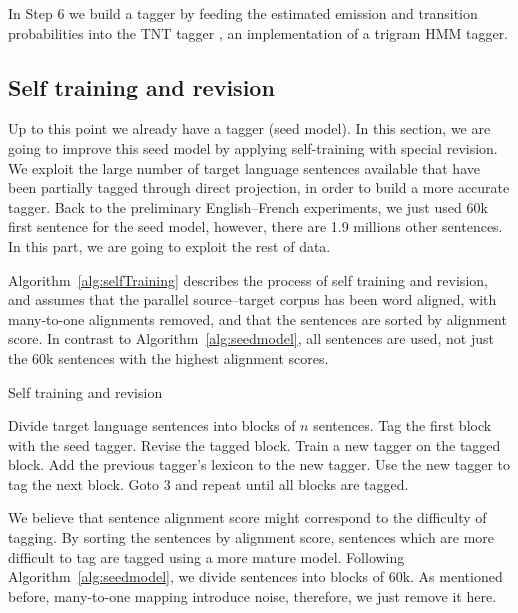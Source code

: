 In Step 6 we build a tagger by feeding the estimated emission and
transition probabilities into the TNT tagger \cite{TNTTagger}, an
implementation of a trigram HMM tagger.


\subsection{Self training and revision}
\label{selfTrainingAndRevision}
Up to this point we already have a tagger (seed model). In this section, we are going to improve this seed model by applying self-training with special revision. We exploit the large number of target language sentences available that have been
partially tagged through direct projection, in order to build a more
accurate tagger. Back to the preliminary English--French experiments, we just used 60k first sentence for the seed model, however, there are 1.9 millions other sentences. In this part, we are going to exploit the rest of data. 

Algorithm~\ref{alg:selfTraining} describes the
process of self training and revision, and assumes that the parallel
source--target corpus has been word aligned, with many-to-one
alignments removed, and that the sentences are sorted by alignment
score. In contrast to Algorithm~\ref{alg:seedmodel}, all sentences are
used, not just the 60k sentences with the highest alignment scores.

\begin{algorithm}
\caption{Self training and revision}
\label{alg:selfTraining}
\begin{algorithmic} [1]
\STATE Divide target language sentences into blocks of $n$ sentences.
\STATE Tag the first block with the seed tagger.
\STATE Revise the tagged block.
\STATE Train a new tagger on the tagged block.
\STATE Add the previous tagger's lexicon to the new tagger.  
\STATE Use the new tagger to tag the next block.
\STATE Goto 3 and repeat until all blocks are tagged.
\end{algorithmic}
\end{algorithm}

We believe that sentence alignment score might correspond to
the difficulty of tagging. By sorting the sentences by alignment score,
sentences which are more difficult to tag are tagged using a more
mature model.  Following Algorithm~\ref{alg:seedmodel}, we divide
sentences into blocks of 60k. As mentioned before, many-to-one mapping introduce noise, therefore, we just remove it here. 

